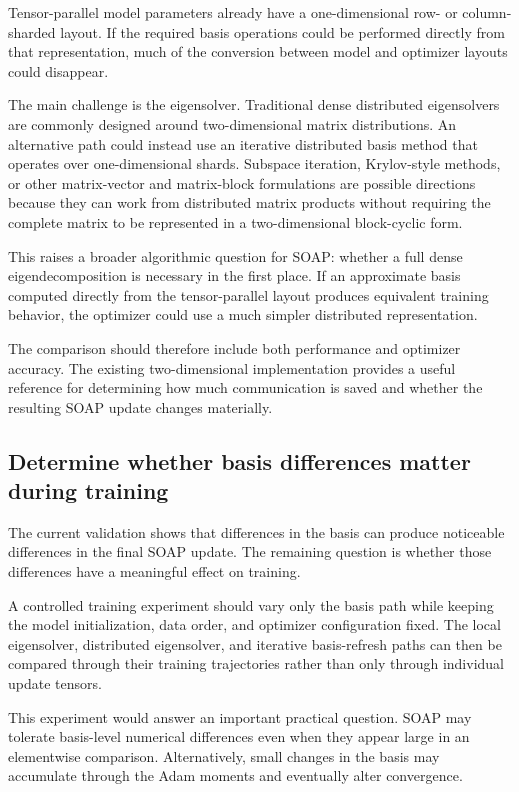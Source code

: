 \documentclass[11pt]{article}
\begin{document}
Tensor-parallel model parameters already have a one-dimensional row- or column-sharded layout. If the required basis operations could be performed directly from that representation, much of the conversion between model and optimizer layouts could disappear.

The main challenge is the eigensolver. Traditional dense distributed eigensolvers are commonly designed around two-dimensional matrix distributions. An alternative path could instead use an iterative distributed basis method that operates over one-dimensional shards. Subspace iteration, Krylov-style methods, or other matrix-vector and matrix-block formulations are possible directions because they can work from distributed matrix products without requiring the complete matrix to be represented in a two-dimensional block-cyclic form.

This raises a broader algorithmic question for SOAP: whether a full dense eigendecomposition is necessary in the first place. If an approximate basis computed directly from the tensor-parallel layout produces equivalent training behavior, the optimizer could use a much simpler distributed representation.

The comparison should therefore include both performance and optimizer accuracy. The existing two-dimensional implementation provides a useful reference for determining how much communication is saved and whether the resulting SOAP update changes materially.

\subsection{Determine whether basis differences matter during training}

The current validation shows that differences in the basis can produce noticeable differences in the final SOAP update. The remaining question is whether those differences have a meaningful effect on training.

A controlled training experiment should vary only the basis path while keeping the model initialization, data order, and optimizer configuration fixed. The local eigensolver, distributed eigensolver, and iterative basis-refresh paths can then be compared through their training trajectories rather than only through individual update tensors.

This experiment would answer an important practical question. SOAP may tolerate basis-level numerical differences even when they appear large in an elementwise comparison. Alternatively, small changes in the basis may accumulate through the Adam moments and eventually alter convergence.
\end{document}
